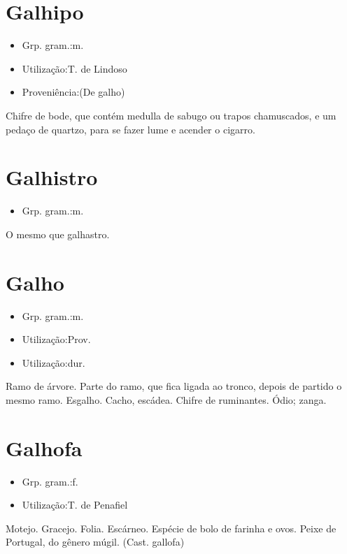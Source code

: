 \section{Galhipo}
\begin{itemize}
\item {Grp. gram.:m.}
\end{itemize}
\begin{itemize}
\item {Utilização:T. de Lindoso}
\end{itemize}
\begin{itemize}
\item {Proveniência:(De \textunderscore galho\textunderscore )}
\end{itemize}
Chifre de bode, que contém medulla de sabugo ou trapos chamuscados, e um pedaço de quartzo, para se fazer lume e acender o cigarro.
\section{Galhistro}
\begin{itemize}
\item {Grp. gram.:m.}
\end{itemize}
O mesmo que \textunderscore galhastro\textunderscore .
\section{Galho}
\begin{itemize}
\item {Grp. gram.:m.}
\end{itemize}
\begin{itemize}
\item {Utilização:Prov.}
\end{itemize}
\begin{itemize}
\item {Utilização:dur.}
\end{itemize}
Ramo de árvore.
Parte do ramo, que fica ligada ao tronco, depois de partido o mesmo ramo.
Esgalho.
Cacho, escádea.
Chifre de ruminantes.
Ódio; zanga.
\section{Galhofa}
\begin{itemize}
\item {Grp. gram.:f.}
\end{itemize}
\begin{itemize}
\item {Utilização:T. de Penafiel}
\end{itemize}
Motejo.
Gracejo.
Folia.
Escárneo.
Espécie de bolo de farinha e ovos.
Peixe de Portugal, do gênero múgil.
(Cast. \textunderscore gallofa\textunderscore )
